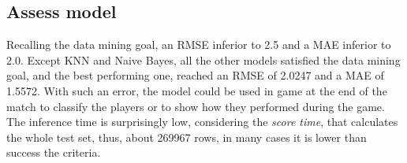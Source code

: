

\subsection{Assess model}

Recalling the data mining goal, an RMSE inferior to 2.5 and a MAE inferior to 2.0. Except KNN and Naive Bayes, all the other models satisfied the data mining goal, and the best performing one, reached an RMSE of 2.0247 and a MAE of 1.5572. With such an error, the model could be used in game at the end of the match to classify the players or to show how they performed during the game.
The inference time is surprisingly low, considering the \textit{score time}, that calculates the whole test set, thus, about 269967 rows, in many cases it is lower than success the criteria.